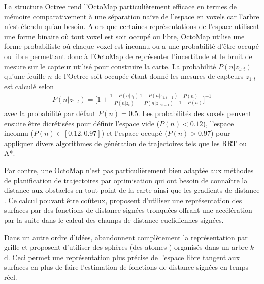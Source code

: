 La structure Octree rend l'OctoMap particulièrement efficace en termes de mémoire comparativement à une séparation naïve de l'espace en voxels car l'arbre n'est étendu qu'au besoin. Alors que certaines représentations de l'espace utilisent une forme binaire où tout voxel est soit occupé ou libre, OctoMap utilise une forme probabiliste où chaque voxel est inconnu ou a une probabilité d'être occupé ou libre permettant donc à l'OctoMap de représenter l'incertitude et le bruit de mesure sur le capteur utilisé pour construire la carte. La probabilité $P(n|z_{1:t})$ qu'une feuille $n$ de l'Octree soit occupée étant donné les mesures de capteurs $z_{1:t}$ est calculé selon
\begin{align}
  P(n|z_{1:t}) = \Bigg[ 1 +
    \frac{1 - P(n|z_{t})}{P(n|z_{t})}
    \frac{1 - P(n|z_{1:t-1})}{P(n|z_{1:t-1})}
    \frac{P(n)}{1 - P(n)}
  \Bigg]^{-1}
  \label{eq:octomap_probability}
\end{align}
avec la probabilité par défaut $P(n) = 0.5$. Les probabilités des voxels peuvent ensuite être dicrétisées pour définir l'espace vide ($P(n) < 0.12$), l'espace inconnu ($P(n) \in [0.12, 0.97]$) et l'espace occupé ($P(n) > 0.97$) pour appliquer divers algorithmes de génération de trajectoires tels que les RRT ou A*.

Par contre, une OctoMap n'est pas particulièrement bien adaptée aux méthodes de planification de trajectoires par optimisation qui ont besoin de connaître la distance aux obstacles en tout point de la carte ainsi que les gradients de distance \citep{ratliff2009chomp, Oleynikova2016}. Ce calcul pouvant être coûteux, \cite{oleynikova2017voxblox} proposent d'utiliser une représentation des surfaces par des fonctions de distance signées tronquées offrant une accélération par la suite dans le calcul des champs de distance euclidiennes signées.

Dans un autre ordre d'idées, \cite{Fridovich-Keil2017AtomMap} abandonnent complètement la représentation par grille et proposent d'utiliser des sphères (des \guillemotleft atomes \guillemotright) organisés dans un arbre $k$-d. Ceci permet une représentation plus précise de l'espace libre tangent aux surfaces en plus de faire l'estimation de fonctions de distance signées en temps réel.



